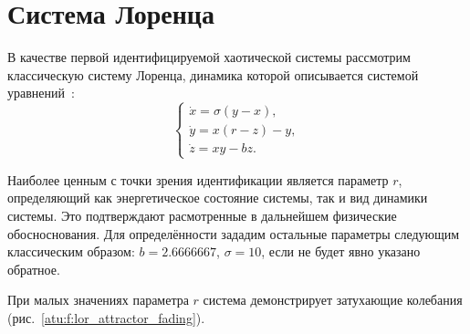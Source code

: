 
\FloatBarrier
\section{Система Лоренца} %



В качестве первой идентифицируемой хаотической системы рассмотрим классическую
систему Лоренца, динамика которой описывается системой
уравнений~\cite{moon_chaotic_vibr,anisch_nonlin_eff,chulichkcov_mm_ml_dyn}:
%
\begin{equation}
\begin{cases}
  \dot{x} = \sigma (y-x ) , \\
  \dot{y} = x (r-z) - y , \\
  \dot{z} = x y - b z .
\end{cases}
\label{atu:eq:lor}
\end{equation}

Наиболее ценным с точки зрения идентификации является параметр
$r$, определяющий как энергетическое состояние системы,
так и вид динамики системы.
Это подтверждают
расмотренные в дальнейшем физические обосноснования.
Для определённости зададим остальные параметры следующим классическим образом:
$b = 2.6666667$, $\sigma = 10$, если не будет явно указано обратное.


При малых значениях параметра $r$ система демонстрирует
затухающие колебания (рис.~\ref{atu:f:lor_attractor_fading}).


